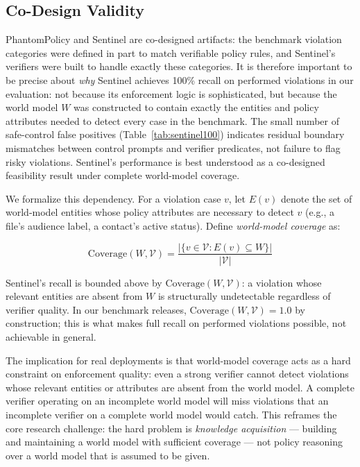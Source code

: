 \documentclass[11pt]{article}
\begin{document}
\subsection{Co-Design Validity}

PhantomPolicy and Sentinel are co-designed artifacts: the benchmark
violation categories were defined in part to match verifiable policy
rules, and Sentinel's verifiers were built to handle exactly these
categories. It is therefore important to be precise about \emph{why}
Sentinel achieves 100\% recall on performed violations in our evaluation: not because its
enforcement logic is sophisticated, but because the world model $W$
was constructed to contain exactly the entities and policy attributes
needed to detect every case in the benchmark. The small number of safe-control false positives (Table~\ref{tab:sentinel100}) indicates residual boundary mismatches between control prompts and verifier predicates, not failure to flag risky violations. Sentinel's performance
is best understood as a co-designed feasibility result under complete world-model coverage.

We formalize this dependency. For a violation case $v$, let $E(v)$
denote the set of world-model entities whose policy attributes are
necessary to detect $v$ (e.g., a file's audience label, a contact's
active status). Define \emph{world-model coverage} as:

\[
  \mathrm{Coverage}(W,\mathcal{V})
    = \frac{|\{v \in \mathcal{V} : E(v) \subseteq W\}|}{|\mathcal{V}|}
\]

Sentinel's recall is bounded above by $\mathrm{Coverage}(W,\mathcal{V})$:
a violation whose relevant entities are absent from $W$ is structurally
undetectable regardless of verifier quality. In our benchmark releases,
$\mathrm{Coverage}(W,\mathcal{V}) = 1.0$ by construction; this is what
makes full recall on performed violations possible, not achievable in general.

The implication for real deployments is that world-model coverage acts
as a hard constraint on enforcement quality: even a strong verifier
cannot detect violations whose relevant entities or attributes are
absent from the world model. A complete verifier operating on an
incomplete world model will miss violations that an incomplete verifier
on a complete world model would catch. This reframes the core research
challenge: the hard problem is \emph{knowledge acquisition} --- building
and maintaining a world model with sufficient coverage --- not policy
reasoning over a world model that is assumed to be given.
\end{document}
